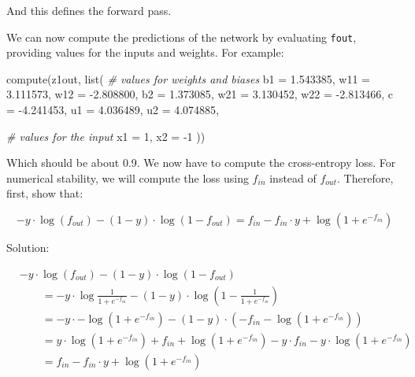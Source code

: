 \documentclass[
  a4paper,
]{article}
\newenvironment{Shaded}{\begin{snugshade}}{\end{snugshade}}
\newcommand{\AttributeTok}[1]{\textcolor[rgb]{0.77,0.63,0.00}{#1}}
\newcommand{\CommentTok}[1]{\textcolor[rgb]{0.56,0.35,0.01}{\textit{#1}}}
\newcommand{\DecValTok}[1]{\textcolor[rgb]{0.00,0.00,0.81}{#1}}
\newcommand{\FloatTok}[1]{\textcolor[rgb]{0.00,0.00,0.81}{#1}}
\newcommand{\FunctionTok}[1]{\textcolor[rgb]{0.00,0.00,0.00}{#1}}
\newcommand{\NormalTok}[1]{#1}
\newcommand{\SpecialCharTok}[1]{\textcolor[rgb]{0.00,0.00,0.00}{#1}}
\begin{document}
And this defines the forward pass.

We can now compute the predictions of the network by evaluating
\texttt{fout}, providing values for the inputs and weights. For example:

\begin{Shaded}
\begin{Highlighting}[]
\FunctionTok{compute}\NormalTok{(z1out, }\FunctionTok{list}\NormalTok{(}
  \CommentTok{\# values for weights and biases}
  \AttributeTok{b1 =} \FloatTok{1.543385}\NormalTok{, }\AttributeTok{w11 =} \FloatTok{3.111573}\NormalTok{, }\AttributeTok{w12 =} \SpecialCharTok{{-}}\FloatTok{2.808800}\NormalTok{,}
  \AttributeTok{b2 =} \FloatTok{1.373085}\NormalTok{, }\AttributeTok{w21 =} \FloatTok{3.130452}\NormalTok{, }\AttributeTok{w22 =} \SpecialCharTok{{-}}\FloatTok{2.813466}\NormalTok{,}
  \AttributeTok{c =} \SpecialCharTok{{-}}\FloatTok{4.241453}\NormalTok{, }\AttributeTok{u1 =} \FloatTok{4.036489}\NormalTok{, }\AttributeTok{u2 =} \FloatTok{4.074885}\NormalTok{,}
  
  \CommentTok{\# values for the input}
  \AttributeTok{x1 =} \DecValTok{1}\NormalTok{, }\AttributeTok{x2 =} \SpecialCharTok{{-}}\DecValTok{1}
\NormalTok{))}
\end{Highlighting}
\end{Shaded}

Which should be about 0.9. We now have to compute the cross-entropy
loss. For numerical stability, we will compute the loss using \(f_{in}\)
instead of \(f_{out}\). Therefore, first, show that:

\begin{equation}
-y\cdot\log(f_{out})-(1-y)\cdot\log(1-f_{out})=
f_{in}-f_{in}\cdot y+\log(1+e^{-f_{in}})
\end{equation}

Solution:

\begin{align}
&-y\cdot\log (f_{out})-(1-y)\cdot\log(1-f_{out}) \\
&\qquad=-y\cdot\log\frac{1}{1+e^{-f_{in}}}-(1-y)\cdot\log\left(1-\frac{1}{1+e^{-f_{in}}}\right) \\
&\qquad=
-y\cdot-\log\left(1+e^{-f_{in}}\right)
-(1-y)\cdot\left(-f_{in}-\log\left(1+e^{-f_{in}}\right)\right) \\
&\qquad=
y\cdot\log\left(1+e^{-f_{in}}\right)
+f_{in}+\log\left(1+e^{-f_{in}}\right)
-y\cdot f_{in}-y\cdot\log\left(1+e^{-f_{in}}\right) \\
&\qquad=f_{in}-f_{in}\cdot y+\log(1+e^{-f_{in}})
\end{align}
\end{document}
